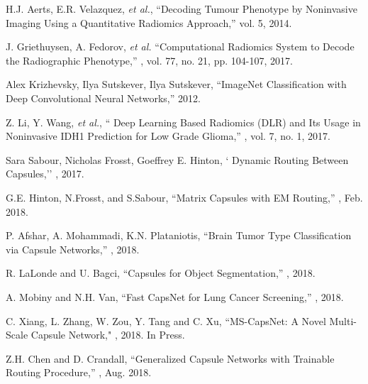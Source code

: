 \documentclass{article}
\begin{document}
\begin{thebibliography}{10}
H.J. Aerts, E.R. Velazquez, \textit{et al.},
\newblock ``Decoding Tumour Phenotype by Noninvasive Imaging Using a Quantitative Radiomics Approach,''
 vol. 5, 2014.

J. Griethuysen, A. Fedorov, {\em et al.}
\newblock ``Computational Radiomics System to Decode the Radiographic Phenotype,''
, vol. 77, no. 21, pp. 104-107, 2017.

Alex Krizhevsky, Ilya Sutskever, Ilya Sutskever,
\newblock 	``ImageNet Classification with Deep Convolutional Neural Networks,''
 2012.

Z. Li, Y. Wang, {\em et al.},
\newblock `` Deep Learning Based Radiomics (DLR) and Its Usage in Noninvasive IDH1 Prediction for Low Grade Glioma,''
, vol. 7, no. 1, 2017.

Sara Sabour, Nicholas Frosst, Goeffrey E. Hinton,
\newblock ` Dynamic Routing Between Capsules,''
, 2017.

G.E. Hinton, N.Frosst, and S.Sabour,
\newblock ``Matrix Capsules with EM Routing,''
, Feb. 2018.

P. Afshar, A. Mohammadi, K.N. Plataniotis,
\newblock ``Brain Tumor Type Classification via Capsule Networks,''
, 2018.

R. LaLonde and U. Bagci,
\newblock ``Capsules for Object Segmentation,''
, 2018.

A. Mobiny and N.H. Van,
\newblock ``Fast CapsNet for Lung Cancer Screening,''
, 2018.


C. Xiang, L. Zhang, W. Zou, Y. Tang and C. Xu,
\newblock ``MS-CapsNet: A Novel Multi-Scale Capsule Network,"
, 2018. In Press.

Z.H. Chen and D. Crandall,
\newblock ``Generalized Capsule Networks with Trainable Routing Procedure,''
, Aug. 2018.


\end{thebibliography}
\end{document}
